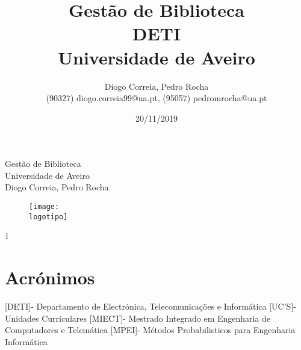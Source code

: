 \documentclass{report}
\begin{document}
%
\def\titulo{Gestão de Biblioteca}
\def\data{20/11/2019}
\def\autores{Diogo Correia, Pedro Rocha}
\def\autorescontactos{(90327) diogo.correia99@ua.pt, (95057) pedromrocha@ua.pt}
\def\versao{1}
\def\departamento{DETI}
\def\empresa{Universidade de Aveiro}
\def\logotipo{ua.pdf}
%
%
\begin{titlepage}

\begin{center}
%
\vspace*{50mm}
%
{\Huge \titulo}\\ 
%
\vspace{10mm}
%
{\Large \empresa}\\
%
\vspace{10mm}
%
{\LARGE \autores}\\ 
%
\vspace{30mm}
%
\begin{figure}[h]
\center
\texttt{[image: \\logotipo]}
\end{figure}
%
\vspace{30mm}
\end{center}
%
\begin{flushright}
\versao
\end{flushright}
\end{titlepage}

\title{%
{\Huge\textbf{\titulo}}\\
{\Large \departamento\\ \empresa}
}
%
\author{%
    \autores \\
    \autorescontactos
}
%
\date{\data}
%
\maketitle




\tableofcontents

\chapter{Acrónimos}
\label{chap.Acrónimos}
\begin{acronym}
[DETI]{- Departamento de Electrónica, Telecomunicações e Informática}
 [UC'S]{- Unidades Curriculares}
[MIECT]{- Mestrado Integrado em Engenharia de Computadores e Telemática}
[MPEI]{- Métodos Probabilisticos para Engenharia Informática}
\end{acronym}
\clearpage
{}
\end{document}
